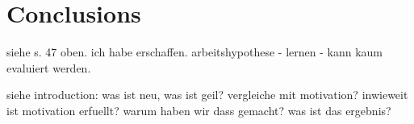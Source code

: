 \chapter{Conclusions}


siehe s. 47 oben.
ich habe erschaffen.
arbeitshypothese - lernen - kann kaum evaluiert werden.

siehe introduction:
was ist neu, was ist geil?
vergleiche mit motivation?
inwieweit ist motivation erfuellt?
warum haben wir dass gemacht? was ist das ergebnis?
